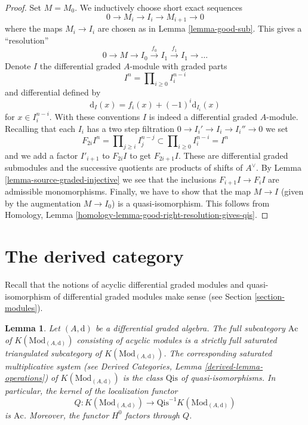 \documentclass{stacks-project}
\theoremstyle{plain}
\newtheorem{lemma}[subsection]{Lemma}
\theoremstyle{definition}
\theoremstyle{remark}
\numberwithin{equation}{subsection}
\begin{document}
\begin{proof}
Set $M = M_0$. We inductively choose short exact sequences
$$
0 \to M_i \to I_i \to M_{i + 1} \to 0
$$
where the maps $M_i \to I_i$ are chosen as in Lemma \ref{lemma-good-sub}.
This gives a ``resolution''
$$
0 \to M \to I_0 \xrightarrow{f_0} I_1 \xrightarrow{f_1} I_1 \to \ldots
$$
Denote $I$ the differential graded $A$-module with graded parts
$$
I^n = \prod\nolimits_{i \geq 0} I^{n - i}_i
$$
and differential defined by
$$
\text{d}_I(x) = f_i(x) + (-1)^i \text{d}_{I_i}(x)
$$
for $x \in I_i^{n - i}$. With these conventions $I$ is indeed a differential
graded $A$-module. Recalling that each $I_i$ has a two step filtration
$0 \to I_i' \to I_i \to I_i'' \to 0$ we set
$$
F_{2i}I^n = \prod\nolimits_{j \geq i} I^{n - j}_j
\subset
\prod\nolimits_{i \geq 0} I^{n - i}_i = I^n
$$
and we add a factor $I'_{i + 1}$ to $F_{2i}I$ to get $F_{2i + 1}I$.
These are differential graded submodules and the successive quotients
are products of shifts of $A^\vee$. By
Lemma \ref{lemma-source-graded-injective} we see that
the inclusions $F_{i + 1}I \to F_iI$ are admissible monomorphisms.
Finally, we have to show that the map $M \to I$ (given by the
augmentation $M \to I_0$) is a quasi-isomorphism. This follows from
Homology, Lemma \ref{homology-lemma-good-right-resolution-gives-qis}.
\end{proof}






\section{The derived category}
\label{section-derived}

\noindent
Recall that the notions of acyclic differential graded modules
and quasi-isomorphism of differential graded modules make sense
(see Section \ref{section-modules}).

\begin{lemma}
\label{lemma-acyclic}
Let $(A, \text{d})$ be a differential graded algebra.
The full subcategory $\text{Ac}$ of $K(\text{Mod}_{(A, \text{d})})$
consisting of acyclic modules is a strictly full saturated triangulated
subcategory of $K(\text{Mod}_{(A, \text{d})})$.
The corresponding saturated multiplicative system
(see Derived Categories, Lemma \ref{derived-lemma-operations})
of $K(\text{Mod}_{(A, \text{d})})$ is the class $\text{Qis}$
of quasi-isomorphisms. In particular, the kernel of the localization
functor
$$
Q : K(\text{Mod}_{(A, \text{d})}) \to
\text{Qis}^{-1}K(\text{Mod}_{(A, \text{d})})
$$
is $\text{Ac}$. Moreover, the functor $H^0$ factors through $Q$.
\end{lemma}
\end{document}
